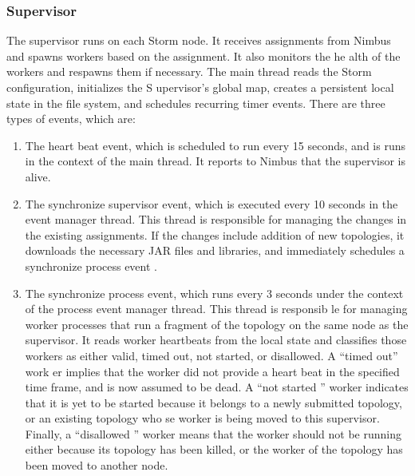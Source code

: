 \documentclass[9pt,twocolumn,twoside]{../../styles/osajnl}
\begin{document}
\subsubsection{Supervisor}


The supervisor runs on each Storm node. It receives assignments from
Nimbus and spawns workers based on the assignment. It also monitors
the he alth of the workers and respawns them if necessary. The main
thread reads the Storm configuration, initializes the S upervisor’s
global map, creates a persistent local state in the file system, and
schedules recurring timer events. There are three types of events,
which are:

\begin{enumerate}
\item The heart beat event, which is scheduled to run every 15
  seconds, and is runs in the context of the main thread. It reports
  to Nimbus that the supervisor is alive.
\item The synchronize supervisor event, which is executed every 10
  seconds in the event manager thread. This thread is responsible for
  managing the changes in the existing assignments. If the changes
  include addition of new topologies, it downloads the necessary JAR
  files and libraries, and immediately schedules a synchronize process
  event .
\item The synchronize process event, which runs every 3 seconds under
  the context of the process event manager thread. This thread is
  responsib le for managing worker processes that run a fragment of
  the topology on the same node as the supervisor. It reads worker
  heartbeats from the local state and classifies those workers as
  either valid, timed out, not started, or disallowed. A “timed out”
  work er implies that the worker did not provide a heart beat in the
  specified time frame, and is now assumed to be dead. A “not started
  ” worker indicates that it is yet to be started because it belongs
  to a newly submitted topology, or an existing topology who se worker
  is being moved to this supervisor. Finally, a “disallowed ” worker
  means that the worker should not be running either because its
  topology has been killed, or the worker of the topology has been
  moved to another node.\\
\end{enumerate}
\end{document}
